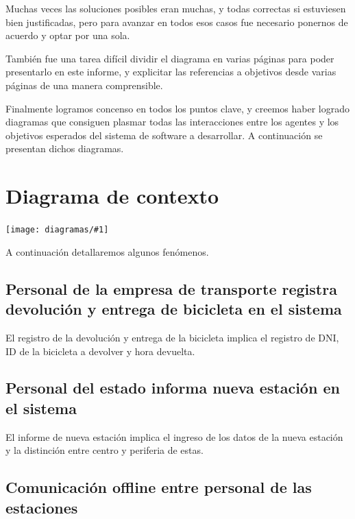 \documentclass[a4paper, 10pt, twoside]{article}
\newcommand{\diagramah}[1]{
  \texttt{[image: diagramas/\#1]}
}
\begin{document}
Muchas veces las soluciones posibles eran muchas, y todas correctas si estuviesen bien justificadas, pero para avanzar en todos esos casos fue necesario ponernos de acuerdo y optar por una sola.

También fue una tarea difícil dividir el diagrama en varias páginas para poder presentarlo en este informe, y explicitar las referencias a objetivos desde varias páginas de una manera comprensible.

Finalmente logramos concenso en todos los puntos clave, y creemos haber logrado diagramas que consiguen plasmar todas las interacciones entre los agentes y los objetivos esperados del sistema de software a desarrollar. A continuación se presentan dichos diagramas.




\section{Diagrama de contexto}

\diagramah{contexto}

A continuación detallaremos algunos fenómenos.

\subsection{Personal de la empresa de transporte registra devolución y entrega de bicicleta en el sistema}

El registro de la devolución y entrega de la bicicleta implica el registro de DNI, ID de la bicicleta a devolver y hora devuelta.

\subsection{Personal del estado informa nueva estación en el sistema}

El informe de nueva estación implica el ingreso de los datos de la nueva estación y la distinción entre centro y periferia de estas.

\subsection{Comunicación offline entre personal de las estaciones}
\end{document}
